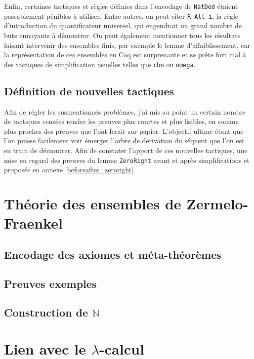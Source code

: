 \documentclass[a4paper]{article}
\newcommand{\N}{\ensuremath{\mathbb{N}}}
\theoremstyle{remark}
\theoremstyle{remark}
\theoremstyle{remark}
\theoremstyle{definition}
\theoremstyle{definition}
\theoremstyle{definition}
\begin{document}
Enfin, certaines tactiques et règles définies dans l'encodage de \verb+NatDed+ étaient passablement pénibles à utiliser. Entre autres, on peut citer \verb+R_All_i+, la règle d'introduction du quantificateur universel, qui engendrait un grand nombre de buts ennuyants à démontrer. On peut également mentionner tous les résultats faisant intervenir des ensembles finis, par exemple le lemme d'affaiblissement, car la représentation de ces ensembles en Coq est surprenante et se prête fort mal à des tactiques de simplification usuelles telles que \verb+cbn+ ou \verb+omega+.

\subsection{Définition de nouvelles tactiques}\label{sol}

Afin de régler les susmentionnés problèmes, j'ai mis au point un certain nombre de tactiques censées rendre les preuves plus courtes et plus lisibles, en somme plus proches des preuves que l'ont ferait sur papier. L'objectif ultime étant que l'on puisse facilement voir émerger l'arbre de dérivation du séquent que l'on est en train de démontrer. Afin de constater l'apport de ces nouvelles tactiques, une mise en regard des preuves du lemme \verb+ZeroRight+ avant et après simplifications et proposée en annexe \ref{beforeafter_zeroright}.



\section{Théorie des ensembles de {\sc Zermelo-Fraenkel}}

\subsection{Encodage des axiomes et méta-théorèmes}

\subsection{Preuves exemples}

\subsection{Construction de $\N$}


\section{Lien avec le $\lambda$-calcul}
\end{document}
